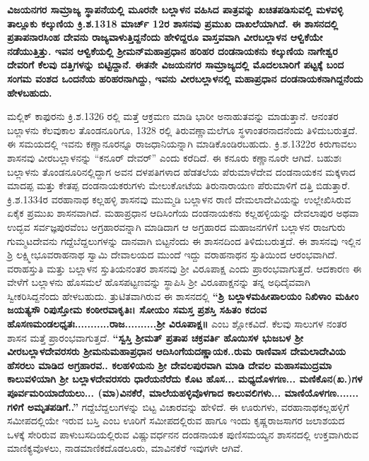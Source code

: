 \textbf{ವಿಜಯನಗರ ಸಾಮ್ರಾಜ್ಯ ಸ್ಥಾಪನೆಯಲ್ಲಿ ಮೂರನೇ ಬಲ್ಲಾಳನ ವಹಿಸಿದ ಪಾತ್ರವನ್ನು ಖಚಿತಪಡಿಸುವಲ್ಲಿ ಮಳವಳ್ಳಿ ತಾಲ್ಲೂಕು ಕಲ್ಕುಣಿಯ ಕ್ರಿ.ಶ.1318 ಮಾರ್ಚ್ 12ರ ಶಾಸನವು ಪ್ರಮುಖ ದಾಖಲೆಯಾಗಿದೆ. ಈ ಶಾಸನದಲ್ಲಿ ಪ್ರತಾಪನಾರಸಿಂಹ ದೇವನು ರಾಜ್ಯವಾಳುತ್ತಿದ್ದನೆಂದು ಹೇಳಿದ್ದರೂ ವಾಸ್ತವವಾಗಿ ವೀರಬಲ್ಲಾಳನ ಆಳ್ವಿಕೆಯೇ ನಡೆಯುತ್ತಿತ್ತು. ಇವನ ಆಳ್ವಿಕೆಯಲ್ಲಿ ಶ‍್ರೀಮನ್​ಮಹಾಪ್ರಧಾನ ಹರಿಹರ ದಂಡನಾಯಕನು ಕಲ್ಕುಣಿಯ ನಾಗೇಶ್ವರ ದೇವರಿಗೆ ಕೆಲವು ದತ್ತಿಗಳನ್ನು ಬಿಟ್ಟಿದ್ದಾನೆ. ಈತನೇ ವಿಜಯನಗರ ಸಾಮ್ರಾಜ್ಯದಲ್ಲಿ ಮೊದಲಬಾರಿಗೆ ಪಟ್ಟಕ್ಕೆ ಬಂದ ಸಂಗಮ ವಂಶದ ಒಂದನೆಯ ಹರಿಹರನಾಗಿದ್ದು, ಇವನು ವೀರಬಲ್ಲಾಳನಲ್ಲಿ ಮಹಾಪ್ರಧಾನ ದಂಡನಾಯಕನಾಗಿದ್ದನೆಂದು ಹೇಳಬಹುದು.}

ಮಲ್ಲಿಕ್​ ಕಾಫುರನು ಕ್ರಿ.ಶ.1326 ರಲ್ಲಿ ಮತ್ತೆ ಆಕ್ರಮಣ ಮಾಡಿ ಭಾರೀ ಅನಾಹುತವನ್ನು ಮಾಡುತ್ತಾನೆ. ಆನಂತರ ಬಲ್ಲಾಳನು ಕೆಲವುಕಾಲ ತೊಂಡನೂರಿಗೂ, 1328 ರಲ್ಲಿ ತಿರುವಣ್ಣಾಮಲೆಗೂ ಸ್ಥಳಾಂತರನಾದನೆಂದು ತಿಳಿದುಬರುತ್ತದೆ. ಈ ಸಮಯದಲ್ಲಿ ಇವನು ಕಣ್ಣಾನೂರನ್ನೂ ರಾಜಧಾನಿಯನ್ನಾಗಿ ಮಾಡಿಕೊಂಡಿರಬಹುದು. ಕ್ರಿ.ಶ.1322ರ ಕಿರುಗಾವಲು ಶಾಸನವು ವೀರಬಲ್ಲಾಳನನ್ನು “ಕನೂರ್​ ದೇವರ್​” ಎಂದು ಕರೆದಿದೆ. ಈ ಕನೂರು ಕಣ್ಣಾನೂರೇ ಆಗಿದೆ. ಬಹುಶಃ ಬಲ್ಲಾಳನು ತೊಂಡನೂರಿನಲ್ಲಿದ್ದಾಗ ಅವನ ದಳಪತಿಗಳಾದ ಹೆಡತಲೆಯ ಪೆರುಮಾಳೆದೇವ ದಂಡನಾಯಕನ ಮಕ್ಕಳಾದ ಮಾದಪ್ಪ ಮತ್ತು ಕೇತಪ್ಪ ದಂಡನಾಯಕರುಗಳು ಮೇಲುಕೋಟೆಯ ತಿರುನಾರಾಯಣ ಪೆರುಮಾಳಿಗೆ ದತ್ತಿ ಬಿಡುತ್ತಾರೆ. ಕ್ರಿ.ಶ.1334ರ ವರಹಾನಾಥ ಕಲ್ಲಹಳ್ಳಿ ಶಾಸನವು ಮುಮ್ಮಡಿ ಬಲ್ಲಾಳನ ರಾಣಿ ದೇಮಲಾದೇವಿಯನ್ನು ಉಲ್ಲೇಖಿಸಿರುವ ಏಕೈಕ ಪ್ರಮುಖ ಶಾಸನವಾಗಿದೆ. ಮಹಾಪ್ರಧಾನ ಆದಿಸಿಂಗೆಯ ದಂಡನಾಯಕನು ಕಲ್ಲಹಳ್ಳಿಯನ್ನು ದೇವಲಾಪುರ ಅಥವಾ ಉದ್ಭವ ಸರ್ವಜ್ಞಪುರವೆಂಬ ಅಗ್ರಹಾರವನ್ನಾಗಿ ಮಾಡಿದಾಗ ಆ ಅಗ್ರಹಾರದ ಮಹಾಜನಗಳಿಗೆ ಬಲ್ಲಾಳನ ರಾಜಗುರು ಗುಮ್ಮಟದೇವನು ಗದ್ದೆಬೆದ್ದಲುಗಳನ್ನು ದಾನವಾಗಿ ಬಿಟ್ಟನೆಂದು ಈ ಶಾಸನದಿಂದ ತಿಳಿದುಬರುತ್ತದೆ. ಈ ಶಾಸನವು ಇಲ್ಲಿನ ಶ್ರಿ ಲಕ್ಷ್ಮೀಭೂವರಾಹನಾಥ ಸ್ವಾಮಿ ದೇವಾಲಯದ ಮುಂದೆ ಇದ್ದು ವರಾಹನಾಥನ ಸ್ತುತಿಯಿಂದ ಆರಂಭವಾಗಿದೆ. ವರಾಹಸ್ತುತಿ ಮತ್ತು ಬಲ್ಲಾಳನ ಸ್ತುತಿಯನಂತರ ಶಾಸನವು ಶ‍್ರೀ ವಿರೂಪಾಕ್ಷ ಎಂದು ಪ್ರಾರಂಭವಾಗುತ್ತದೆ. ಆದಕಾರಣ ಈ ವೇಳೆಗೆ ಬಲ್ಲಾಳನು ಹೊಸಮಲೆ ಹೊಸಪಟ್ಟಣವನ್ನು ಸ್ಥಾಪಿಸಿ ಶ‍್ರೀ ವಿರೂಪಾಕ್ಷನನ್ನು ತನ್ನ ಅಧಿದೈವವಾಗಿ ಸ್ವೀಕರಿಸಿದ್ದನೆಂದು ಹೇಳಬಹುದು. ತ್ರುಟಿತವಾಗಿರುವ ಈ ಶಾಸನದಲ್ಲಿ \textbf{“ಶ್ರಿ ಬಲ್ಲಾಳಮಹೀಪಾಲಯಂ ನಿಖಿಳಾಂ ಮಹೀಂ ಜಯತ್ಯಸೌ ರಿಪುಸ್ತೋಮ ಕಂಠೀರವಾಕೃತಿಃ। ಸೋಯಂ ಸಮಸ್ತ ಪ್ರಶಸ್ತಿ ಸಹಿತಂ ಕದಂವ ಹೊಸಣಮಂಡಲಧೃತಃ...........ರಾಜ..........ಶ‍್ರೀ ವಿರೂಪಾಕ್ಷ॥} ಎಂಬ ಶ್ಲೋಕವಿದೆ. ಕೆಲವು ಸಾಲುಗಳ ನಂತರ ಶಾಸನ ಮತ್ತೆ ಪ್ರಾರಂಭವಾಗುತ್ತದೆ. \textbf{“ಸ್ವಸ್ತಿ ಶ‍್ರೀಮತ್​ ಪ್ರತಾಪ ಚಕ್ರವರ್ತಿ ಹೊಯಿಸಳ ಭುಜಬಳ ಶ‍್ರೀ ವೀರಬಲ್ಲಾಳದೇವರಸರು ಶ‍್ರೀಮನುಮಹಾಪ್ರಧಾನ ಆದಿಸಿಂಗೆಯದಣ್ಣಾಯಕ..ರುಮ ರಾಣಿವಾಸ ದೇಮಲಾದೇವಿಯ ಹೆಸರಲು ಮಾಡಿದ ಅಗ್ರಹಾರವ.. ಕಲಹಳಿಯನು ಶ‍್ರೀ ದೇವಲಪುರವಾಗಿ ಮಾಡಿ ದೇವಲ ಮಹಾಸಮುದ್ರಮಾ ಕಾಲುವಳಿಯಾಗಿ ಶ‍್ರೀ ಬಲ್ಲಾಳದೇವರಸರು ಧಾರೆಯನೆರೆದು ಕೊಟ ಹೊಸ... ಮಧ್ಯದೊಳಗಣ... ಮಣಿಕೊನ(ಖ.)ಗಳ ಪೂರ್ವಮರಿಯಾದೆಯಲು... (ಮಾ)ವಿನಕೆರೆ, ಮಾಲೆಯಹಳ್ಳಿವೊಳಗಾದ ಕಾಲುವಲಿಗಳು... ಮಾಣಿಯೊಳಗಣ....... ಗಳಿಗೆ ಅಮೃತಪಡಿಗೆ..”} ಗದ್ದೆಬೆದ್ದಲುಗಳನ್ನು ಬಿಟ್ಟ ವಿಚಾರವನ್ನು ಹೇಳಿದೆ. ಈ ಊರುಗಳು, ವರಹಾನಾಥಕಲ್ಲಹಳ್ಳಿಗೆ ಸಮೀಪದಲ್ಲಿಯೇ ಇರುವ ಬಸ್ತಿ ಎಂಬ ಊರಿಗೆ ಸಮೀಪದಲ್ಲಿರುವ ಹಾಗೂ ಇಂದು ಕೃಷ್ಣರಾಜಸಾಗರ ಜಲಾಶಯದ ಒಳಕ್ಕೆ ಸೇರಿರುವ ಪಾಳುಬಸದಿಯಲ್ಲಿರುವ ವಿಷ್ಣುವರ್ಧನನ ದಂಡನಾಯಕ ಪುಣಿಸಮಯ್ಯನ ಶಾಸನದಲ್ಲಿ ಉಕ್ತವಾಗಿರುವ ಮಾಣಿಕ್ಯವೊಳಲು, ನಾಡಮಾಣಿಕದೊಡಲೂರು, ಮಾವಿನಕೆರೆ ಇವುಗಳೇ ಆಗಿವೆ. 

